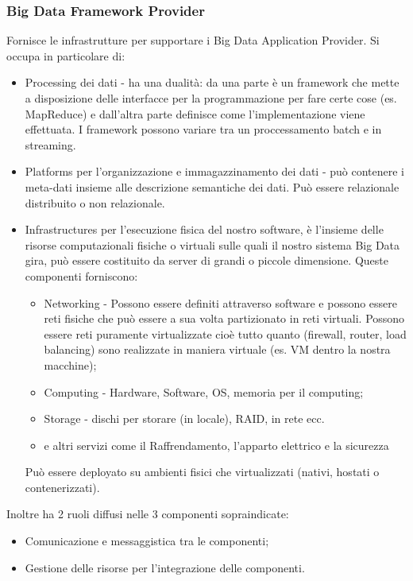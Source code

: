 \documentclass[11pt, twocolumn]{article}
\newenvironment{myitemize}
{ \begin{itemize}[topsep=0ex]
		\setlength{\itemsep}{0pt}
		\setlength{\parskip}{0pt}
		\setlength{\parsep}{0pt}     }
	{ \end{itemize}                  }
\begin{document}
\subsubsection{Big Data Framework Provider}
Fornisce le infrastrutture per supportare i Big Data Application Provider. Si occupa in particolare di:
\begin{myitemize}
	\item Processing dei dati - ha una dualità: da una parte è un framework che mette a disposizione delle interfacce per la programmazione per fare certe cose (es. MapReduce) e dall'altra parte definisce come l'implementazione viene effettuata. I framework possono variare tra un proccessamento batch e in streaming.
	\item Platforms per l'organizzazione e immagazzinamento dei dati - può contenere i meta-dati insieme alle descrizione semantiche dei dati. 
	Può essere relazionale distribuito o non relazionale.
	\item Infrastructures per l'esecuzione fisica del nostro software, è l'insieme delle risorse computazionali fisiche o virtuali sulle quali il nostro sistema Big Data gira, può essere costituito da server di grandi o piccole dimensione. 
	Queste componenti forniscono:
	\begin{myitemize}
		\item Networking - Possono essere definiti attraverso software e possono essere reti fisiche che può essere a sua volta partizionato in reti virtuali. 
		Possono essere reti puramente virtualizzate cioè tutto quanto (firewall, router, load balancing) sono realizzate in maniera virtuale (es. VM dentro la nostra macchine);
		\item Computing - Hardware, Software, OS, memoria per il computing;
		\item Storage - dischi per storare (in locale), RAID, in rete ecc.
		\item e altri servizi come il Raffrendamento, l'apparto elettrico e la sicurezza
	\end{myitemize}
	Può essere deployato su ambienti fisici che virtualizzati (nativi, hostati o contenerizzati).
\end{myitemize}
Inoltre ha 2 ruoli diffusi nelle 3 componenti sopraindicate:
\begin{myitemize}
	\item Comunicazione e messaggistica tra le componenti;
	\item Gestione delle risorse per l'integrazione delle componenti.
\end{myitemize}
\end{document}
